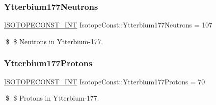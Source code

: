 \subsubsection{\texorpdfstring{Ytterbium177\+Neutrons}{Ytterbium177Neutrons}}
{\footnotesize\ttfamily \mbox{\hyperlink{group___isotope_const-_macros_ga5f18360b3e99483a35c32d789e62621c}{I\+S\+O\+T\+O\+P\+E\+C\+O\+N\+S\+T\+\_\+\+I\+NT}} Isotope\+Const\+::\+Ytterbium177\+Neutrons = 107}

\$ \$ Neutrons in Ytterbium-\/177. \mbox{\label{group___isotope_const-_ytterbium-_yb177_gadb19478725fdc79369588818f214f22e}} 
\subsubsection{\texorpdfstring{Ytterbium177\+Protons}{Ytterbium177Protons}}
{\footnotesize\ttfamily \mbox{\hyperlink{group___isotope_const-_macros_ga5f18360b3e99483a35c32d789e62621c}{I\+S\+O\+T\+O\+P\+E\+C\+O\+N\+S\+T\+\_\+\+I\+NT}} Isotope\+Const\+::\+Ytterbium177\+Protons = 70}

\$ \$ Protons in Ytterbium-\/177. 